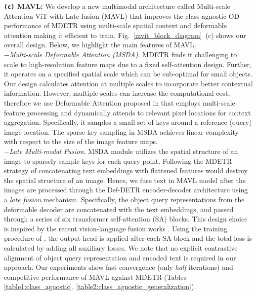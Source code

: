 \documentclass[runningheads]{llncs}
\newcommand{\txt}[1]{{\texttt{#1}}}
\begin{document}
\noindent \textbf{\txt{(c)} MAVL:}  We develop a new multimodal architecture called Multi-scale Attention ViT with Late fusion (MAVL) that improves the class-agnostic OD performance of MDETR {using multi-scale spatial context and deformable attention} making it efficient to train. Fig.~\ref{mvit_block_diagram}~(c) shows our overall design. Below, we highlight the main features of MAVL: \\
\noindent
$-$\textit{Multi-scale Deformable Attention (MSDA).} MDETR \cite{mdetr} finds it challenging to scale to high-resolution feature maps due to a fixed self-attention design. 
Further, it operates on a specified spatial scale which can be sub-optimal for small objects. Our design calculates attention at multiple scales to incorporate better contextual information. However, multiple scales can increase the computational cost, therefore we use Deformable Attention proposed in \cite{zhu2020deformable} that employs multi-scale feature processing and dynamically attends to relevant pixel locations for context aggregation. Specifically, it samples a small set of keys around a reference (query) image location. The sparse key sampling in MSDA achieves linear complexity with respect to the size of the image feature maps.\\
\noindent
$-$\textit{Late Multi-modal Fusion.} MSDA module
utilizes the spatial structure of an image to sparsely sample keys for each query point. Following the MDETR strategy of concatenating text embeddings with flattened 
features would destroy the spatial structure of an image. Hence, we fuse text in MAVL model after the images are processed through the Def-DETR encoder-decoder architecture using a \emph{late fusion} mechanism. Specifically, the object query representations from the deformable decoder are concatenated with the text embeddings, and passed through a series of {six} transformer self-attention (SA) blocks. This design choice is inspired by the recent vision-language fusion works \cite{ViLBERT,VL-BERT,LXMERT,sun2019videobert}. Using the training procedure of \cite{DETR}, the output head is applied after each SA block and the total loss is calculated by adding all auxiliary losses. We note that no explicit contrastive alignment of object query representation and encoded text is required in our approach. Our experiments show fast convergence (only \emph{half} iterations) and competitive performance of MAVL against MDETR (Tables \ref{table1:class_agnostic}, \ref{table2:class_agnostic_generalization}).
\end{document}
